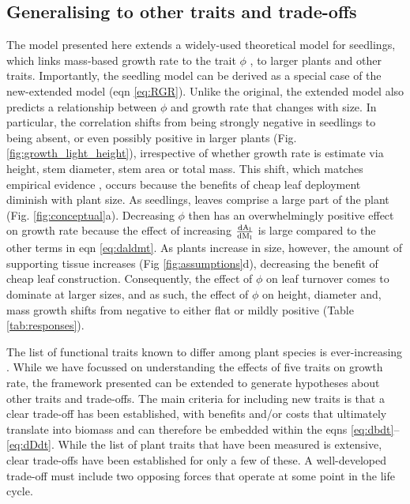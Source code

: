 \documentclass[9pt,twocolumn,twoside]{pnas-new}
\newcommand{\ud}{\ensuremath{\rm{d}}}
\begin{document}
\subsection{Generalising to other traits and trade-offs}

The model presented here extends a widely-used theoretical model for seedlings, which links mass-based growth rate to the trait $\phi$ \citep{Lambers-1992, Wright-2000}, to larger plants and other traits. Importantly, the seedling model can be derived as a special case of the new-extended model (eqn \ref{eq:RGR}). Unlike the original, the extended model also predicts a relationship between $\phi$ and growth rate that changes with size. In particular, the correlation shifts from being strongly negative in seedlings to being absent, or even possibly positive in larger plants (Fig. \ref{fig:growth_light_height}), irrespective of whether growth rate is estimate via height, stem diameter, stem area or total mass. This shift, which matches empirical evidence \citep{Poorter-2008, Wright-2010, Herault-2011, Paine-2015, Gibert-2016}, occurs because the benefits of cheap leaf deployment diminish with plant size. As seedlings, leaves comprise a large part of the plant (Fig. \ref{fig:conceptual}a). Decreasing $\phi$ then has an overwhelmingly positive effect on growth rate because the effect of increasing $\frac{\ud A_{\rm l}}{\ud M_{\rm l}}$ is large compared to the other terms in eqn \ref{eq:daldmt}. As plants increase in size, however, the amount of supporting tissue increases (Fig \ref{fig:assumptions}d), decreasing the benefit of cheap leaf construction. Consequently, the effect of $\phi$ on leaf turnover comes to dominate at larger sizes, and as such, the effect of $\phi$ on height, diameter and, mass growth shifts from negative to either flat or mildly positive  (Table \ref{tab:responses}).

The list of functional traits known to differ among plant species is ever-increasing \citep{Perez-2013}. While we have focussed on understanding the effects of five traits on growth rate, the framework presented can be extended to generate hypotheses about other traits and trade-offs. The main criteria for including new traits is that a clear trade-off has been established, with benefits and/or costs that ultimately translate into biomass and can therefore be embedded within the eqns \ref{eq:dbdt}--\ref{eq:dDdt}. While the list of plant traits that have been measured is extensive, clear trade-offs have been established for only a few of these. A well-developed trade-off must include two opposing forces that operate at some point in the life cycle.
\end{document}
